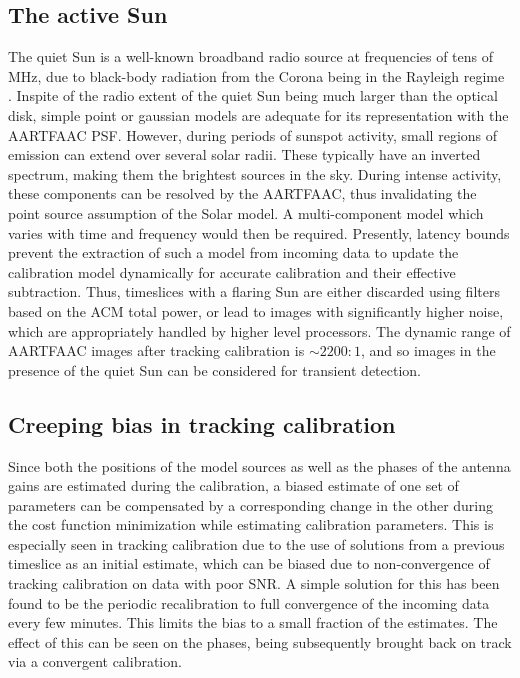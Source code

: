 \documentclass{aa}
\begin{document}
\subsection{The active Sun}

The quiet Sun  is a well-known broadband radio source at  frequencies of tens of
MHz, due to black-body radiation from  the Corona being in the Rayleigh regime .
Inspite of the radio extent of the  quiet Sun being much larger than the optical
disk, simple point  or gaussian models are adequate  for its representation with
the AARTFAAC PSF.  However, during periods of sunspot activity, small regions of
emission can extend  over several solar radii. These  typically have an inverted
spectrum, making them the brightest sources in the sky. During intense activity,
these components  can be resolved by  the AARTFAAC, thus  invalidating the point
source assumption of the Solar  model. A multi-component model which varies with
time and frequency would then be required. Presently, latency bounds prevent the
extraction of  such a model from  incoming data to update  the calibration model
dynamically  for accurate  calibration and  their effective  subtraction.  Thus,
timeslices with  a flaring Sun are  either discarded using filters  based on the
ACM total  power, or lead to  images with significantly higher  noise, which are
appropriately handled by higher level  processors. The dynamic range of AARTFAAC
images after tracking calibration is $\sim2200:1$, and so images in the presence
of the quiet Sun can be considered for transient detection.


\subsection{Creeping bias in tracking calibration}

Since both  the positions  of the  model sources as  well as  the phases  of the
antenna gains are estimated during the calibration, a biased estimate of one set
of  parameters can  be  compensated by  a corresponding change in the  other during the cost function minimization while estimating calibration parameters. This  is
especially  seen in  tracking calibration  due to  the use  of solutions  from a
previous  timeslice  as  an  initial  estimate,  which  can  be  biased  due  to
non-convergence of tracking  calibration on data with  poor SNR.  A simple solution for this has  been found to be
the periodic  recalibration to full convergence  of the incoming  data every few
minutes. This limits the bias to a small fraction of the estimates.   The effect  of this  can  be seen  on the  phases, being  subsequently
brought back on track via a convergent calibration.
\end{document}
